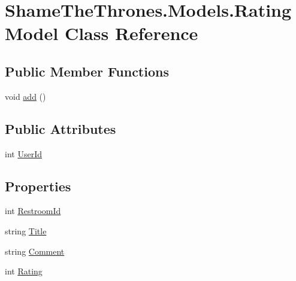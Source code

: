 \hypertarget{class_shame_the_thrones_1_1_models_1_1_rating_model}{}\section{Shame\+The\+Thrones.\+Models.\+Rating\+Model Class Reference}
\label{class_shame_the_thrones_1_1_models_1_1_rating_model}
\subsection*{Public Member Functions}
\begin{DoxyCompactItemize}
\item 
void \hyperlink{class_shame_the_thrones_1_1_models_1_1_rating_model_ae87578bb27a775a250496bc325fd8e80}{add} ()
\end{DoxyCompactItemize}
\subsection*{Public Attributes}
\begin{DoxyCompactItemize}
\item 
int \hyperlink{class_shame_the_thrones_1_1_models_1_1_rating_model_a0442afe5f23b3ab92a441d07d9421c94}{User\+Id}
\end{DoxyCompactItemize}
\subsection*{Properties}
\begin{DoxyCompactItemize}
\item 
int \hyperlink{class_shame_the_thrones_1_1_models_1_1_rating_model_a864f01242b8b2be20f47658b96146b99}{Restroom\+Id}
\item 
string \hyperlink{class_shame_the_thrones_1_1_models_1_1_rating_model_a8945c5badcc0ca0a9481ba4d7f654ea8}{Title}
\item 
string \hyperlink{class_shame_the_thrones_1_1_models_1_1_rating_model_a7b6c023e9e10e8be3cd6ca1d1aa0456a}{Comment}
\item 
int \hyperlink{class_shame_the_thrones_1_1_models_1_1_rating_model_a5da8d444d09d6be12a500c3225b28929}{Rating}
\end{DoxyCompactItemize}


